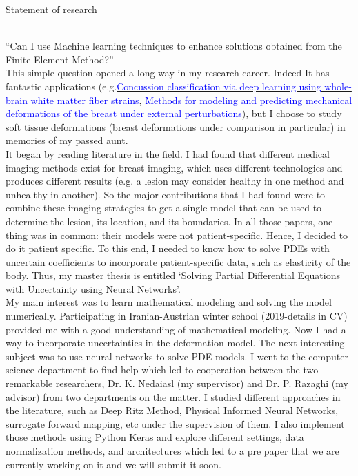 \documentclass{resume} %
\begin{document}


\begin{cSection}{Statement of research}
	
	\\
	
	
	
	\vspace*{1.5em}	
	``Can I use Machine learning techniques to enhance solutions obtained from the Finite Element Method?'' \\
	This simple question opened a long way in my research career. Indeed It has fantastic applications (e.g.\href{https://www.ncbi.nlm.nih.gov/pmc/articles/PMC5967816/}{\textcolor{blue}{Concussion classification via deep learning using whole-brain white matter fiber strains}}, \href{https://link.springer.com/chapter/10.1007/3-540-45468-3_189}{\textcolor{blue}{Methods for modeling and predicting mechanical deformations of the breast under external perturbations}}), but I choose to study soft tissue deformations (breast deformations under comparison in particular) in memories of my passed aunt.\\
	It began by reading literature in the field. I had found that different medical imaging methods exist for breast imaging, which uses different technologies and produces different results (e.g. a lesion may consider healthy in one method and unhealthy in another). So the major contributions that I had found were to combine these imaging strategies to get a single model that can be used to determine the lesion, its location, and its boundaries. In all those papers, one thing was in common: their models were not patient-specific. Hence, I decided to do it patient specific. To this end, I needed to know how to solve PDEs with uncertain coefficients to incorporate patient-specific data, such as elasticity of the body. Thus, my master thesis is entitled `Solving Partial Differential Equations with Uncertainty using Neural Networks'.\\
	My main interest was to learn mathematical modeling and solving the model numerically. Participating in Iranian-Austrian winter school (2019-details in CV) provided me with a good understanding of mathematical modeling. Now I had a way to incorporate uncertainties in the deformation model. The next interesting subject was to use neural networks to solve PDE models. I went to the computer science department to find help which led to cooperation between the two remarkable researchers, Dr. K. Nedaiasl (my supervisor) and Dr. P. Razaghi (my advisor) from two departments on the matter. I studied different approaches in the literature, such as Deep Ritz Method, Physical Informed Neural Networks, surrogate forward mapping, etc under the supervision of them. I also implement those methods using Python Keras and explore different settings, data normalization methods, and architectures which led to a pre paper that we are currently working on it and we will submit it soon. \\

\end{cSection}
\end{document}
